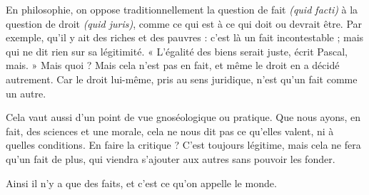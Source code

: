 En philosophie, on oppose traditionnellement la question de fait {\it (quid
facti)} à la question de droit {\it (quid juris)}, comme ce qui est à ce qui doit ou
devrait être. Par exemple, qu’il y ait des riches et des pauvres : c’est là un fait
incontestable ; mais qui ne dit rien sur sa légitimité. « L'égalité des biens serait
juste, écrit Pascal, mais. » Mais quoi ? Mais cela n’est pas en fait, et même le
droit en a décidé autrement. Car le droit lui-même, pris au sens juridique, n’est
qu’un fait comme un autre.

Cela vaut aussi d’un point de vue gnoséologique ou pratique. Que nous
ayons, en fait, des sciences et une morale, cela ne nous dit pas ce qu’elles valent,
ni à quelles conditions. En faire la critique ? C’est toujours légitime, mais cela
ne fera qu’un fait de plus, qui viendra s'ajouter aux autres sans pouvoir les
fonder.

Ainsi il n’y a que des faits, et c’est ce qu’on appelle le monde.

